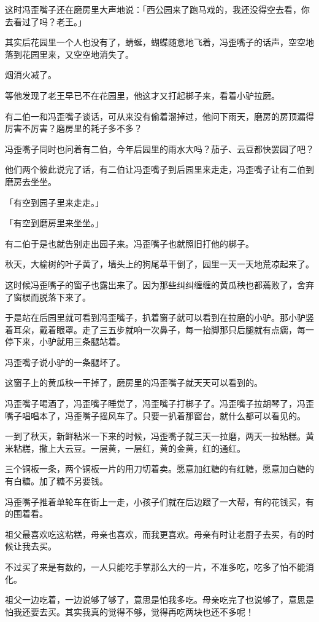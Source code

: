 \documentclass[UTF8]{ctexart}
\begin{document}
这时冯歪嘴子还在磨房里大声地说：「西公园来了跑马戏的，我还没得空去看，你去看过了吗？老王。」

其实后花园里一个人也没有了，蜻蜒，蝴蝶随意地飞着，冯歪嘴子的话声，空空地落到花园里来，又空空地消失了。

{烟消火减了。}

等他发现了老王早已不在花园里，他这才又打起梆子来，看着小驴拉磨。

有二伯一和冯歪嘴子谈话，可从来没有偷着溜掉过，他问下雨天，磨房的房顶漏得厉害不厉害？磨房里的耗子多不多？

冯歪嘴子同时也问着有二伯，今年后园里的雨水大吗？茄子、云豆都快罢园了吧？

他们两个彼此说完了话，有二伯让冯歪嘴子到后园里来走走，冯歪嘴子让有二伯到磨房去坐坐。

「有空到园子里来走走。」

「有空到磨房里来坐坐。」

有二伯于是也就告别走出园子来。冯歪嘴子也就照旧打他的梆子。

秋天，大榆树的叶子黄了，墙头上的狗尾草干倒了，园里一天一天地荒凉起来了。

这时候冯歪嘴子的窗子也露出来了。因为那些纠纠缠缠的黄瓜秧也都蔫败了，舍弃了窗棂而脱落下来了。

于是站在后园里就可看到冯歪嘴子，扒着窗子就可以看到在拉磨的小驴。那小驴竖着耳朵，戴着眼罩。走了三五步就响一次鼻子，每一抬脚那只后腿就有点瘸，每一停下来，小驴就用三条腿站着。

冯歪嘴子说小驴的一条腿坏了。

这窗子上的黄瓜秧一干掉了，磨房里的冯歪嘴子就天天可以看到的。

冯歪嘴子喝酒了，冯歪嘴子睡觉了，冯歪嘴子打梆子了。冯歪嘴子拉胡琴了，冯歪嘴子唱唱本了，冯歪嘴子摇风车了。只要一扒着那窗台，就什么都可以看见的。

一到了秋天，新鲜粘米一下来的时候，冯歪嘴子就三天一拉磨，两天一拉粘糕。黄米粘糕，撒上大云豆。一层黄，一层红，黄的金黄，红的通红。

三个铜板一条，两个铜板一片的用刀切着卖。愿意加红糖的有红糖，愿意加白糖的有白糖。加了糖不另要钱。

冯歪嘴子推着单轮车在街上一走，小孩子们就在后边跟了一大帮，有的花钱买，有的围着看。

祖父最喜欢吃这粘糕，母亲也喜欢，而我更喜欢。母亲有时让老厨子去买，有的时候让我去买。

不过买了来是有数的，一人只能吃手掌那么大的一片，不准多吃，吃多了怕不能消化。

祖父一边吃着，一边说够了够了，意思是怕我多吃。母亲吃完了也说够了，意思是怕我还要去买。其实我真的觉得不够，觉得再吃两块也还不多呢！
\end{document}
